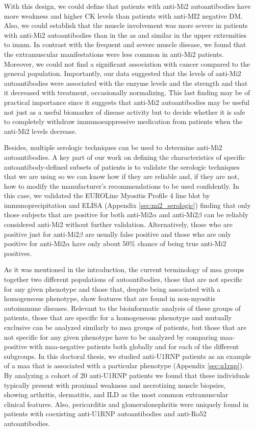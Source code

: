 With this design, we could define that patients with anti-Mi2 autoantibodies have more weakness and higher CK levels than patients with anti-MI2 negative DM. Also, we could establish that the muscle involvement was more severe in patients with anti-Mi2 autoantibodies than in the \gls{as} and similar in the upper extremities to \gls{imnm}. In contrast with the frequent and severe muscle disease, we found that the extramuscular manifestations were less common in anti-Mi2 patients. Moreover, we could not find a significant association with cancer compared to the general population. Importantly, our data suggested that the levels of anti-Mi2 autoantibodies were associated with the enzyme levels and the strength and that it decreased with treatment, occasionally normalizing. This last finding may be of practical importance since it suggests that anti-Mi2 autoantibodies may be useful not just as a useful biomarker of disease activity but to decide whether it is safe to completely withdraw immunosuppressive medication from patients when the anti-Mi2 levels decrease.

Besides, multiple serologic techniques can be used to determine anti-Mi2 autoantibodies. A key part of our work on defining the characteristics of specific autoantibody-defined subsets of patients is to validate the serologic techniques that we are using so we can know how if they are reliable and, if they are not, how to modify the manufacturer's recommendations to be used confidently. In this case, we validated the EUROLine Myositis Profile 4 line blot by immunoprecipitation and ELISA (Appendix \autoref{sec:mi2_serologic}) finding that only those subjects that are positive for both anti-Mi2$\alpha$ and anti-Mi2$\beta$ can be reliably considered anti-Mi2 without further validation. Alternatively, those who are positive just for anti-Mi2$\beta$ are usually false positive and those who are only positive for anti-Mi2$\alpha$ have only about 50\% chance of being true anti-Mi2 positives.

As it was mentioned in the introduction, the current terminology of \gls{msa} groups together two different populations of autoantibodies, those that are not specific for any given phenotype and those that, despite being associated with a homogeneous phenotype, show features that are found in non-myositis autoimmune diseases. Relevant to the bioinformatic analysis of these groups of patients, those that are specific for a homogeneous phenotype and mutually exclusive can be analyzed similarly to \gls{msa} groups of patients, but those that are not specific for any given phenotype have to be analyzed by comparing \gls{maa}-positive with \gls{maa}-negative patients both globally and for each of the different subgroups. In this doctoral thesis, we studied anti-U1RNP patients as an example of a \gls{maa} that is associated with a particular phenotype (Appendix \autoref{sec:u1rnp}). By analyzing a cohort of 20 anti-U1RNP patients we found that these individuals typically present with proximal weakness and necrotizing muscle biopsies, showing arthritis, dermatitis, and ILD as the most common extramuscular clinical features. Also, pericarditis and glomerulonephritis were uniquely found in patients with coexisting anti-U1RNP autoantibodies and anti-Ro52 autoantibodies.

